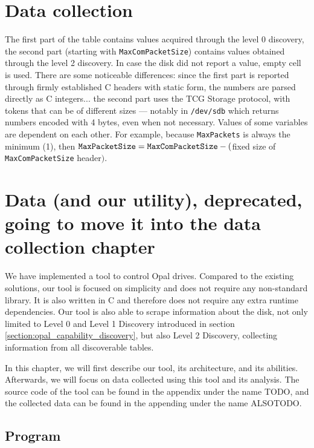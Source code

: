 \chapter{Data collection}


The first part of the table contains values acquired through the level 0 discovery, the second part (starting with \verb|MaxComPacketSize|) contains values obtained through the level 2 discovery. In case the disk did not report a value, empty cell is used.
There are some noticeable differences: since the first part is reported through firmly established C headers with static form, the numbers are parsed directly as C integers... the second part uses the TCG Storage protocol, with tokens that can be of different sizes --- notably in \verb|/dev/sdb| which returns numbers encoded with 4 bytes, even when not necessary.
Values of some variables are dependent on each other. For example, because \verb|MaxPackets| is always the minimum (1), then $\verb|MaxPacketSize| = \verb|MaxComPacketSize| - ($fixed size of \verb|MaxComPacketSize| header$)$.




\chapter{Data (and our utility), deprecated, going to move it into the data collection chapter}

We have implemented a tool to control Opal drives.
Compared to the existing solutions, our tool is focused on simplicity and does not require any non-standard library. It is also written in C and therefore does not require any extra runtime dependencies. 
Our tool is also able to scrape information about the disk, not only limited to Level 0 and Level 1 Discovery introduced in section \ref{section:opal_capability_discovery}, but also Level 2 Discovery, collecting information from all discoverable tables.

In this chapter, we will first describe our tool, its architecture, and its abilities. 
Afterwards, we will focus on data collected using this tool and its analysis. 
The source code of the tool can be found in the appendix under the name TODO, and the collected data can be found in the appending under the name ALSOTODO.

\section{Program}


